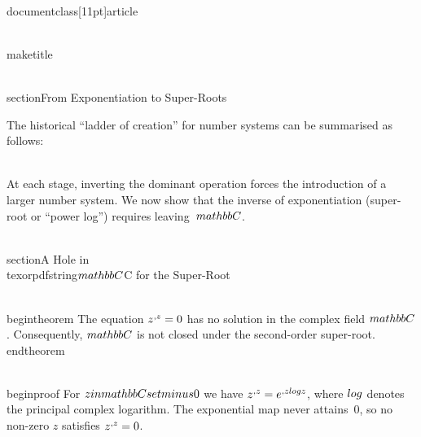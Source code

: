 \\documentclass[11pt]{article}
\begin{document}
\\maketitle

\\section{From Exponentiation to Super-Roots}

The historical ``ladder of creation'' for number systems can be summarised as follows:

\\[
\\mathbb{N} \\xrightarrow{\\text{subtraction}} \\mathbb{Z}
  \\xrightarrow{\\text{division}} \\mathbb{Q}
  \\xrightarrow{\\text{roots}} \\mathbb{R}
  \\xrightarrow{\\text{imaginary roots}} \\mathbb{C}.
\\]

At each stage, inverting the dominant operation forces the introduction of a larger number system. We now show that the inverse of exponentiation (super-root or ``power log'') requires leaving~$\\mathbb{C}$.

\\section{A Hole in \\texorpdfstring{$\\mathbb{C}$}{C} for the Super-Root}

\\begin{theorem}
The equation $z^{\\,z} = 0$ has no solution in the complex field $\\mathbb{C}$. Consequently, $\\mathbb{C}$ is not closed under the second-order super-root.
\\end{theorem}

\\begin{proof}
For $z \\in \\mathbb{C}\\setminus\\{0\\}$ we have $z^{\\,z} = e^{\\,z \\log z}$, where $\\log$ denotes the principal complex logarithm. The exponential map never attains~$0$, so no non-zero $z$ satisfies $z^{\\,z}=0$.
\end{document}
